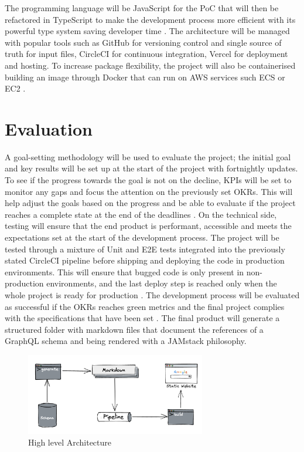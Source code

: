 The programming language will be JavaScript for the PoC that will then be
refactored in TypeScript to make the development process more efficient with its
powerful type system saving developer time
\citep{freemanUnderstandingTypeScript2021}. The architecture will be managed
with popular tools such as GitHub for versioning control and single source of
truth for input files, CircleCI for continuous integration, Vercel for
deployment and hosting. To increase package flexibility, the project will also
be containerised building an image through Docker that can run on AWS services
such ECS or EC2 \citep{pratapyadavFormalApproachDocker2021}.

\section*{Evaluation}
\label{s:Evaluation}
A goal-setting methodology will be used to evaluate the project; the initial
goal and key results will be set up at the start of the project with fortnightly
updates. To see if the progress towards the goal is not on the decline, KPIs
will be set to monitor any gaps and focus the attention on the previously set
OKRs. This will help adjust the goals based on the progress and be able to
evaluate if the project reaches a complete state at the end of the deadlines
\citep{helmoldLeanManagementKPI2020}. On the technical side, testing will ensure
that the end product is performant, accessible and meets the expectations set at
the start of the development process. The project will be tested through a
mixture of Unit and E2E tests integrated into the previously stated CircleCI
pipeline before shipping and deploying the code in production environments. This
will ensure that bugged code is only present in non-production environments, and
the last deploy step is reached only when the whole project is ready for
production \citep{yuUtilisingCIEnvironment2020}. The development process will be
evaluated as successful if the OKRs reaches green metrics and the final project
complies with the specifications that have been set
\citep{helmoldLeanManagementKPI2020}. The final product will generate a
structured folder with markdown files that document the references of a GraphQL
schema and being rendered with a JAMstack philosophy.
\begin{figure}[H]
  \centering
  \includegraphics[width=0.7\textwidth]{figures/architecture}
  \caption{High level Architecture}
  \label{f:architecture}
\end{figure}
